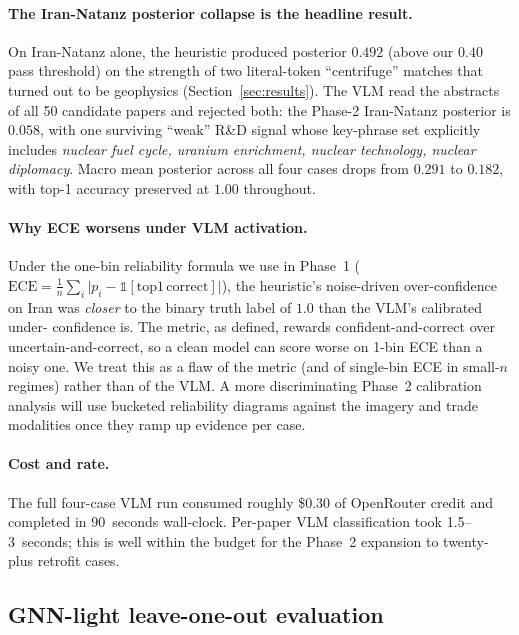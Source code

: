 \documentclass[11pt,a4paper]{article}
\begin{document}
\paragraph{The Iran-Natanz posterior collapse is the headline result.}
On Iran-Natanz alone, the heuristic produced posterior $0.492$ (above
our $0.40$ pass threshold) on the strength of two literal-token
``centrifuge'' matches that turned out to be geophysics
(Section~\ref{sec:results}). The VLM read the abstracts of all
50 candidate papers and rejected both: the Phase-2 Iran-Natanz
posterior is $0.058$, with one surviving ``weak'' R\&D signal whose
key-phrase set explicitly includes \emph{nuclear fuel cycle, uranium
enrichment, nuclear technology, nuclear diplomacy}. Macro mean
posterior across all four cases drops from $0.291$ to $0.182$, with
top-1 accuracy preserved at $1.00$ throughout.

\paragraph{Why ECE worsens under VLM activation.}
Under the one-bin reliability formula we use in Phase~1
($\mathrm{ECE} = \frac{1}{n}\sum_i \lvert p_i - \mathbb{1}[\mathrm{top1\,correct}]\rvert$),
the heuristic's noise-driven over-confidence on Iran was \emph{closer}
to the binary truth label of $1.0$ than the VLM's calibrated under-
confidence is. The metric, as defined, rewards confident-and-correct
over uncertain-and-correct, so a clean model can score worse on
1-bin ECE than a noisy one. We treat this as a flaw of the metric
(and of single-bin ECE in small-$n$ regimes) rather than of the VLM.
A more discriminating Phase~2 calibration analysis will use bucketed
reliability diagrams against the imagery and trade modalities once
they ramp up evidence per case.

\paragraph{Cost and rate.}
The full four-case VLM run consumed roughly \$0.30 of OpenRouter
credit and completed in 90~seconds wall-clock. Per-paper VLM
classification took 1.5--3~seconds; this is well within the budget
for the Phase~2 expansion to twenty-plus retrofit cases.

\subsection{GNN-light leave-one-out evaluation}\label{sec:gnnlite}
\end{document}
